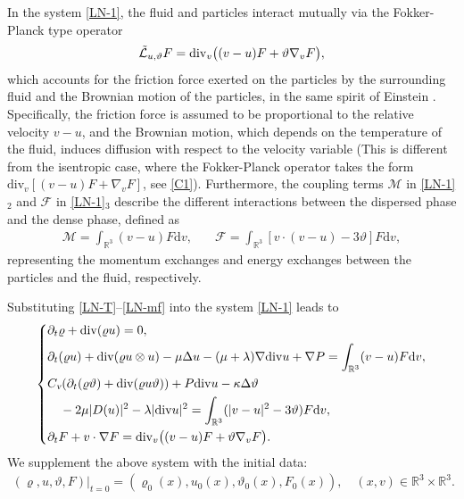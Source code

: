 \documentclass[reqno,11pt]{amsart}
\theoremstyle{plain}
\numberwithin{equation}{section}
\begin{document}
In the system \eqref{LN-1}, the fluid and particles interact mutually via the Fokker-Planck type operator  
\begin{align}\label{LN-Lf}  
{\tilde{\mathcal{L}}_{u,\vartheta }}F={\rm div}_v\big((v-u)F+\vartheta \nabla_v F\big),  
\end{align}  
which accounts for the friction force exerted on the particles by the surrounding 
fluid and the Brownian motion of the particles, in the same spirit  of 
 Einstein  \cite{Ei-1905}. Specifically, the friction force is assumed 
 to be proportional to the relative velocity $v - u$, and the Brownian 
 motion, which depends on the temperature of the fluid, induces diffusion 
 with respect to the velocity variable (This is different from the isentropic case, 
  where 
the Fokker-Planck  operator takes the form $\mathrm{div}_v [(v-u) F + \nabla_v F]$, 
see \eqref{C1}). Furthermore, the coupling terms $\mathcal{M}$ in \eqref{LN-1}$_2$ 
and $\mathcal{F}$ in \eqref{LN-1}$_3$ describe the different interactions between the dispersed 
phase and the dense phase, defined as  
\begin{align}\label{LN-mf}  
\mathcal{M}=\int_{\mathbb{R}^3} (v-u)F\mathrm{d}v , \quad &\mathcal{F}
=\int_{\mathbb{R}^3} [v\cdot(v-u)-3\vartheta ]F\mathrm{d}v,  
\end{align}  
representing the momentum exchanges and energy exchanges between the particles and the fluid, respectively.

Substituting \eqref{LN-T}--\eqref{LN-mf} into the system \eqref{LN-1} leads to 
\begin{equation}\label{LN-2}  
\left\{  
\begin{aligned}  
&\partial_t \varrho + {\rm div} (\varrho u) = 0, \\  
&\partial_t (\varrho u) + {\rm div} (\varrho u \otimes u) - \mu \Delta u 
- (\mu + \lambda)\nabla {\rm div} u + \nabla P = \int_{\mathbb{R}^3} (v-u)F\mathrm{d}v, \\  
&C_\textsl{v}(\partial_t (\varrho \vartheta ) + {\rm div} (\varrho u \vartheta )) 
+ P {\rm div} u - \kappa \Delta \vartheta \\
& \quad  - 2\mu |D(u)|^2 - \lambda|{\rm div} u|^2 = \int_{\mathbb{R}^3} (|v-u|^2 - 3\vartheta )F\mathrm{d}v, \\  
&\partial_t F + v \cdot \nabla F = {\rm div}_v\big((v-u)F + \vartheta \nabla_v F\big).  
\end{aligned}  
\right.  
\end{equation}  
We supplement the above system  with the initial data:  
\begin{align}  \label{LN-3}
(\varrho, u, \vartheta , F)|_{t=0} = (\varrho_0(x), u_0(x), \vartheta _0(x), F_0(x)), 
\quad (x,v) \in \mathbb{R}^3 \times \mathbb{R}^3.  
\end{align}  
\end{document}

